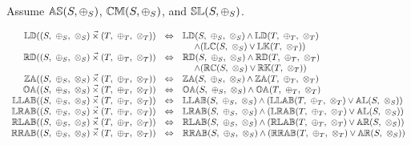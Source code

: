 \documentclass[10pt, ../Summary.tex]{subfiles}
\begin{document}
Assume 
${\mathbb{AS}}(S, \oplus_S)$, 
${\mathbb{CM}}(S, \oplus_S)$,  and 
${\mathbb{SL}}(S, \oplus_S)$. 

\[
\begin{array}{rcl} 
\propname{LD}((S,\ \oplus_S,\ \otimes_S) \lexprod (T,\ \oplus_T,\ \otimes_T)) 
   & \Leftrightarrow
   & \propname{LD}(S,\ \oplus_S,\ \otimes_S) 
     \wedge \propname{LD}(T,\ \oplus_T,\ \otimes_T)\\ 
   & 
   & \ \ \ \ \wedge ( \propname{LC}(S,\ \otimes_S) \vee \propname{LK}(T,\ \otimes_T) )
  \\
\propname{RD}((S,\ \oplus_S,\ \otimes_S) \lexprod (T,\ \oplus_T,\ \otimes_T)) 
   & \Leftrightarrow
   & \propname{RD}(S,\ \oplus_S,\ \otimes_S) 
    \wedge \propname{RD}(T,\ \oplus_T,\ \otimes_T) \\ 
   & 
   & \ \ \ \ \wedge ( \propname{RC}(S,\ \otimes_S) \vee \propname{RK}(T,\ \otimes_T) )
   \\ 
\propname{ZA}((S,\ \oplus_S,\ \otimes_S) \lexprod (T,\ \oplus_T,\ \otimes_T)) 
    & \Leftrightarrow
    & \propname{ZA}(S,\ \oplus_S,\ \otimes_S) \wedge \propname{ZA}(T,\ \oplus_T,\ \otimes_T)
   \\
\propname{OA}((S,\ \oplus_S,\ \otimes_S) \lexprod (T,\ \oplus_T,\ \otimes_T)) 
    & \Leftrightarrow
    & \propname{OA}(S,\ \oplus_S,\ \otimes_S) \wedge \propname{OA}(T,\ \oplus_T,\ \otimes_T)
   \\
\propname{LLAB}((S,\ \oplus_S,\ \otimes_S) \lexprod (T,\ \oplus_T,\ \otimes_T)) 
    & \Leftrightarrow
    & \propname{LLAB}(S,\ \oplus_S,\ \otimes_S) \wedge  
      (\propname{LLAB}(T,\ \oplus_T,\ \otimes_T) \vee \propname{AL}(S,\ \otimes_S)) 
    \\ 
\propname{LRAB}((S,\ \oplus_S,\ \otimes_S) \lexprod (T,\ \oplus_T,\ \otimes_T)) 
    & \Leftrightarrow
    & \propname{LRAB}(S,\ \oplus_S,\ \otimes_S) \wedge  
      (\propname{LRAB}(T,\ \oplus_T,\ \otimes_T) \vee \propname{AL}(S,\ \otimes_S)) 
    \\ 
\propname{RLAB}((S,\ \oplus_S,\ \otimes_S) \lexprod (T,\ \oplus_T,\ \otimes_T)) 
    & \Leftrightarrow
    & \propname{RLAB}(S,\ \oplus_S,\ \otimes_S) \wedge  
      (\propname{RLAB}(T,\ \oplus_T,\ \otimes_T) \vee \propname{AR}(S,\ \otimes_S)) 
    \\ 
\propname{RRAB}((S,\ \oplus_S,\ \otimes_S) \lexprod (T,\ \oplus_T,\ \otimes_T)) 
    & \Leftrightarrow
    & \propname{RRAB}(S,\ \oplus_S,\ \otimes_S) \wedge  
      (\propname{RRAB}(T,\ \oplus_T,\ \otimes_T) \vee \propname{AR}(S,\ \otimes_S)) 
    \\ 
\end{array} 
\]
\end{document}

